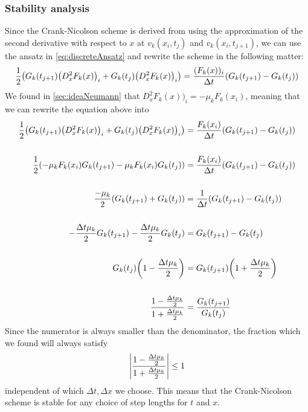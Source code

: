 \subsubsection{Stability analysis}
Since the Crank-Nicolson scheme is derived from using the approximation of the second derivative with respect to \(x\) at \(v_k(x_i,t_j)\) and \(v_k(x_i,t_{j+1})\), we can use the ansatz in \vref{eq:discreteAnsatz} and rewrite the scheme in the following matter:
\[
\frac{1}{2}\qty(G_k(t_{j+1})\qty(D_x^2F_k(x) )_i +  G_k(t_j)\qty(D_x^2F_k(x))_i ) = \frac{(F_k(x) )_i }{\Delta t}\qty(G_k(t_{j+1}) - G_k(t_j) )
\]
We found in \vref{sec:ideaNeumann} that \(D_x^2F_k(x))_i = -\mu_kF_k(x_i)\), meaning that we can rewrite the equation above into
\begin{align*}
\frac{1}{2}\qty(G_k(t_{j+1})\qty(D_x^2F_k(x) )_i +  G_k(t_j)\qty(D_x^2F_k(x))_i ) &= \frac{F_k(x_i) }{\Delta t}\qty(G_k(t_{j+1}) - G_k(t_j) ) \\ \hfill \\
\frac{1}{2}\qty(-\mu_kF_k(x_i)G_k(t_{j+1}) -\mu_kF_k(x_i)G_k(t_j))&= \frac{F_k(x_i)}{\Delta t}\qty(G_k(t_{j+1}) - G_k(t_j) )  \\\hfill \\
\frac{-\mu_k}{2}\qty(G_k(t_{j+1}) +G_k(t_j))&= \frac{1}{\Delta t}\qty(G_k(t_{j+1}) - G_k(t_j) )  \\\hfill \\
-\frac{\Delta t\mu_k}{2}G_k(t_{j+1}) -\frac{\Delta t\mu_k}{2} G_k(t_j)&= G_k(t_{j+1}) - G_k(t_j)   \\\hfill \\
G_k(t_j)\qty(1-\frac{\Delta t\mu_k}{2})&= G_k(t_{j+1})\qty(1+\frac{\Delta t\mu_k}{2} )    \\\hfill \\
\frac{1-\frac{\Delta t\mu_k}{2}}{1+\frac{\Delta t\mu_k}{2}}&= \frac{G_k(t_{j+1}) }{G_k(t_j)}
\end{align*}
Since the numerator is always smaller than the denominator, the fraction which we found will always satisfy
\[
\abs{\frac{1-\frac{\Delta t\mu_k}{2}}{1+\frac{\Delta t\mu_k}{2}}} \leq 1
\]
independent of which \( \Delta t, \Delta x\) we choose. This means that the Crank-Nicolson scheme is stable for any choice of step lengths for \(t\) and \(x\).
